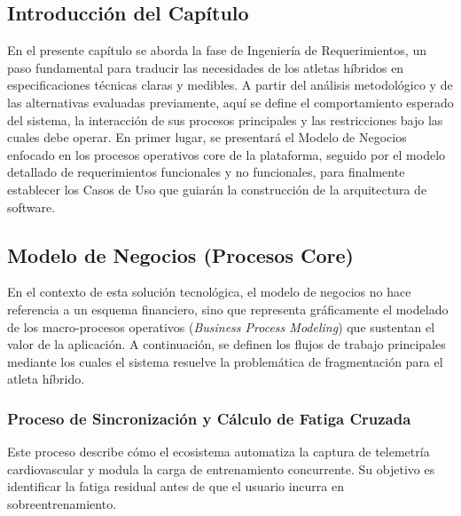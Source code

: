 \documentclass[12pt]{article}
\begin{document}
\subsection{Introducción del Capítulo}
En el presente capítulo se aborda la fase de Ingeniería de Requerimientos, un paso fundamental para traducir las necesidades de los atletas híbridos en especificaciones técnicas claras y medibles. A partir del análisis metodológico y de las alternativas evaluadas previamente, aquí se define el comportamiento esperado del sistema, la interacción de sus procesos principales y las restricciones bajo las cuales debe operar. En primer lugar, se presentará el Modelo de Negocios enfocado en los procesos operativos core de la plataforma, seguido por el modelo detallado de requerimientos funcionales y no funcionales, para finalmente establecer los Casos de Uso que guiarán la construcción de la arquitectura de software.

\subsection{Modelo de Negocios (Procesos Core)}
En el contexto de esta solución tecnológica, el modelo de negocios no hace referencia a un esquema financiero, sino que representa gráficamente el modelado de los macro-procesos operativos (\textit{Business Process Modeling}) que sustentan el valor de la aplicación. A continuación, se definen los flujos de trabajo principales mediante los cuales el sistema resuelve la problemática de fragmentación para el atleta híbrido.
\newpage
\subsubsection{Proceso de Sincronización y Cálculo de Fatiga Cruzada}
Este proceso describe cómo el ecosistema automatiza la captura de telemetría cardiovascular y modula la carga de entrenamiento concurrente. Su objetivo es identificar la fatiga residual antes de que el usuario incurra en sobreentrenamiento.
\end{document}
